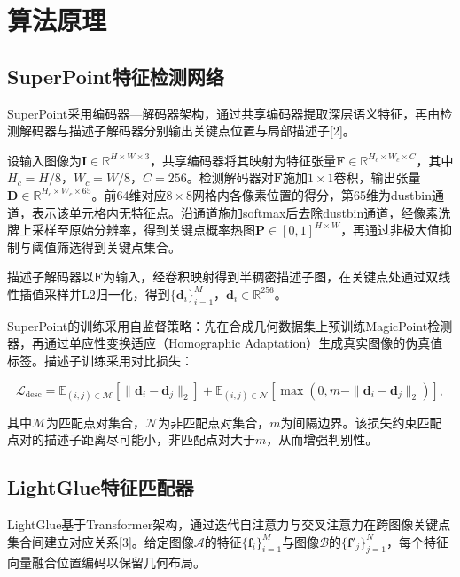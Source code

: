 \documentclass[UTF8,a4paper]{ctexart}
\begin{document}
\section{算法原理}

\subsection{SuperPoint特征检测网络}

SuperPoint采用编码器—解码器架构，通过共享编码器提取深层语义特征，再由检测解码器与描述子解码器分别输出关键点位置与局部描述子[2]。

设输入图像为$\boldsymbol{I} \in \mathbb{R}^{H \times W \times 3}$，共享编码器将其映射为特征张量$\boldsymbol{F} \in \mathbb{R}^{H_c \times W_c \times C}$，其中$H_c = H/8$，$W_c = W/8$，$C = 256$。检测解码器对$\boldsymbol{F}$施加$1\times1$卷积，输出张量$\boldsymbol{D} \in \mathbb{R}^{H_c \times W_c \times 65}$。前64维对应$8\times8$网格内各像素位置的得分，第65维为dustbin通道，表示该单元格内无特征点。沿通道施加softmax后去除dustbin通道，经像素洗牌上采样至原始分辨率，得到关键点概率热图$\boldsymbol{P} \in [0,1]^{H \times W}$，再通过非极大值抑制与阈值筛选得到关键点集合。

描述子解码器以$\boldsymbol{F}$为输入，经卷积映射得到半稠密描述子图，在关键点处通过双线性插值采样并L2归一化，得到$\{\boldsymbol{d}_i\}_{i=1}^{M}$，$\boldsymbol{d}_i \in \mathbb{R}^{256}$。

SuperPoint的训练采用自监督策略：先在合成几何数据集上预训练MagicPoint检测器，再通过单应性变换适应（Homographic Adaptation）生成真实图像的伪真值标签。描述子训练采用对比损失：

$$\mathcal{L}_{\text{desc}} = \mathbb{E}_{(i,j) \in \mathcal{M}} \left[\|\boldsymbol{d}_i - \boldsymbol{d}_j\|_2\right] + \mathbb{E}_{(i,j) \in \mathcal{N}} \left[\max\left(0, m - \|\boldsymbol{d}_i - \boldsymbol{d}_j\|_2\right)\right],$$

其中$\mathcal{M}$为匹配点对集合，$\mathcal{N}$为非匹配点对集合，$m$为间隔边界。该损失约束匹配点对的描述子距离尽可能小，非匹配点对大于$m$，从而增强判别性。

\subsection{LightGlue特征匹配器}

LightGlue基于Transformer架构，通过迭代自注意力与交叉注意力在跨图像关键点集合间建立对应关系[3]。给定图像$\mathcal{A}$的特征$\{\boldsymbol{f}_i\}_{i=1}^{M}$与图像$\mathcal{B}$的$\{\boldsymbol{f}'_j\}_{j=1}^{N}$，每个特征向量融合位置编码以保留几何布局。
\end{document}
